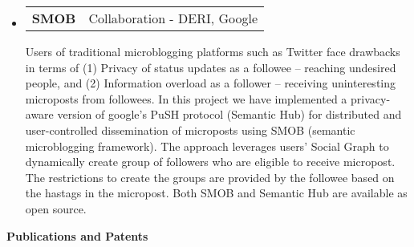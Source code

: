 \documentclass[letterpaper,9pt]{article}
\makeatletter
\newcommand{\resheading}[1]{{\large \colorbox{mygrey}{\begin{minipage}{\textwidth}{\textbf{#1 \vphantom{p\^{E}}}}\end{minipage}}}}
\newcommand{\resprojectheading}[2]{
\begin{tabular*}{7.0in}{l@{\extracolsep{\fill}}r}
		\textbf{#1} & #2\\
\end{tabular*}\vspace{-6pt}}
\makeatother
\begin{document}
\begin{itemize}
\item
\resprojectheading{SMOB}{Collaboration - DERI, Google}
	\vspace{0.1in}

\justify
\hspace{1em} Users of traditional microblogging platforms such as Twitter face drawbacks in terms of (1) Privacy of status updates as a followee -- reaching undesired people, and (2) Information overload as a follower -- receiving uninteresting microposts from followees. In this project we have implemented a privacy-aware version of google's PuSH protocol (Semantic Hub) for distributed and user-controlled dissemination of microposts using SMOB (semantic microblogging framework). The approach leverages users' Social Graph to dynamically create group of followers who are eligible to receive micropost. The restrictions to create the groups are provided by the followee based on the hastags in the micropost. Both SMOB and Semantic Hub are available as open source.

     
\end{itemize}
\resheading{Publications and Patents}
\end{document}
